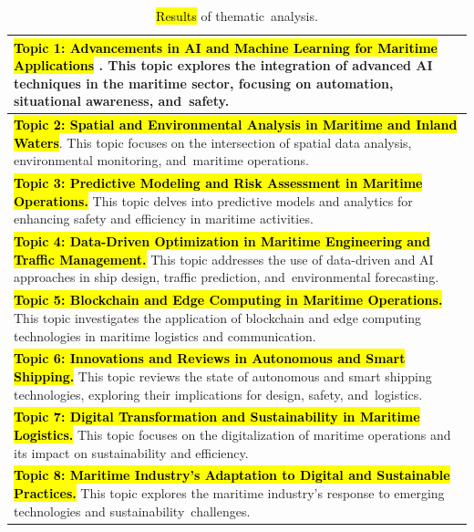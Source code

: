 \documentclass[jmse,review,accept,pdftex,moreauthors]{Definitions/mdpi}
\begin{document}
\begin{table}[H]

	\caption{\hl{Results} %
 of thematic~analysis.}
	\begin{tabularx}{\linewidth}{X}
		\toprule
		\textbf{\hl{Topic 1: Advancements in AI and Machine Learning for Maritime Applications}%
}. This topic explores the integration of advanced AI techniques in the maritime sector, focusing on automation, situational awareness, and~safety.\\	\midrule		
		\textbf{\hl{Topic 2: Spatial and Environmental Analysis in Maritime and Inland Waters}}. This topic focuses on the intersection of spatial data analysis, environmental monitoring, and~maritime operations.\\			\midrule
		\textbf{\hl{Topic 3: Predictive Modeling and Risk Assessment in Maritime Operations.}} This topic delves into predictive models and analytics for enhancing safety and efficiency in maritime activities.\\			\midrule
		\textbf{\hl{Topic 4: Data-Driven Optimization in Maritime Engineering and Traffic Management.}} This topic addresses the use of data-driven and AI approaches in ship design, traffic prediction, and~environmental forecasting.\\		\midrule	
		\textbf{\hl{Topic 5: Blockchain and Edge Computing in Maritime Operations.}} This topic investigates the application of blockchain and edge computing technologies in maritime logistics and communication.\\			\midrule
		\textbf{\hl{Topic 6: Innovations and Reviews in Autonomous and Smart Shipping.}} This topic reviews the state of autonomous and smart shipping technologies, exploring their implications for design, safety, and~logistics.\\		\midrule	
		\textbf{\hl{Topic 7: Digital Transformation and Sustainability in Maritime Logistics.}} This topic focuses on the digitalization of maritime operations and its impact on sustainability and efficiency.\\			\midrule
		\textbf{\hl{Topic 8: Maritime Industry’s Adaptation to Digital and Sustainable Practices.}} This topic explores the maritime industry's response to emerging technologies and sustainability~challenges.\\
		\bottomrule			
	\end{tabularx}
	\label{tab:thematic}
\end{table}
\end{document}
